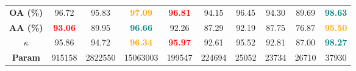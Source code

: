\begin{table}[!hbt]
{\begin{tabular}{c|cccccccc|c}
        \textbf{OA (\%)}       & 96.72 & 95.83 & \textcolor{orange}{\textbf{97.09}} & \textcolor{red}{\textbf{96.81}}  & 94.15 & 96.45 & 94.30 & 89.69 & \textcolor{teal}{\textbf{98.63}} \\ 
        \textbf{AA (\%)}   &\textcolor{red}{\textbf{93.06}} & 89.95 & \textcolor{teal}{\textbf{96.66}}  & 92.26   & 87.29 & 92.19 & 87.75 & 76.87 & \textcolor{orange}{\textbf{95.50}} \\ 
        \textbf{$\kappa$}      & 95.86 & 94.72 & \textcolor{orange}{\textbf{96.34}} & \textcolor{red}{\textbf{95.97}} & 92.61 & 95.52 & 92.81 & 87.00 & \textcolor{teal}{\textbf{98.27}} \\ \hline
        
        \textbf{Param}    & \num{915158} &\num{2822550}  &\num {15063003} &\num{199547} & \num{224694} & \num{25052} & \num{23734} & \num{26710} & \num{37930} \\ \hline 
    \end{tabular}}
    \label{tab:HH}
\end{table}











    
